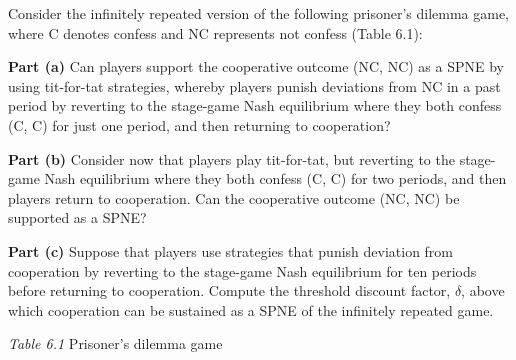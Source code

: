 
Consider the infinitely repeated version of the following prisoner's dilemma game, where C denotes
confess and NC represents not confess (Table 6.1):

\textbf{Part (a)} Can players support the cooperative outcome (NC, NC) as a SPNE by using
tit-for-tat strategies, whereby players punish deviations from NC in a past period by reverting to
the stage-game Nash equilibrium where they both confess (C, C) for just one period, and then
returning to cooperation?

\textbf{Part (b)} Consider now that players play tit-for-tat, but reverting to the stage-game Nash
equilibrium where they both confess (C, C) for two periods, and then players return to cooperation.
Can the cooperative outcome (NC, NC) be supported as a SPNE?

\textbf{Part (c)} Suppose that players use strategies that punish deviation from cooperation by
reverting to the stage-game Nash equilibrium for ten periods before returning to cooperation.
Compute the threshold discount factor, $\delta$, above which cooperation can be sustained as a SPNE
of the infinitely repeated game.
\vspace{-6pt}\begin{center}\small\textit{Table 6.1} Prisoner's dilemma game\end{center}
\resolespaco


